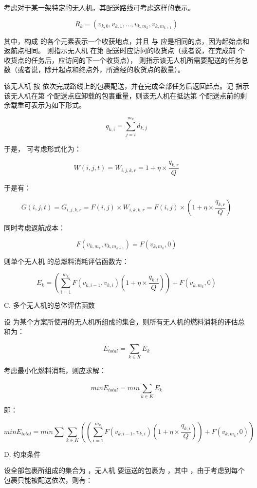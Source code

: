 \documentclass[UTF8,fontset=windows,12pt,a4paper]{ctexart}
\begin{document}
考虑对于某一架特定的无人机，其配送路线可考虑这样的表示。

\[{R}_{k}=\left({v}_{k,0},{v}_{k,1},…,{v}_{k,{m}_{k}},{v}_{k,{m}_{k+1}}\right)\]

其中，构成  的各个元素表示一个收获地点，并且  与  应是相同的点，因为起始点和返航点相同。 则指示无人机  在第  配送时应访问的收货点（或者说，在完成前  个收货点的任务后，应访问的下一个收货点）， 则指示该无人机所需要配送的任务总数（或者说，除开起点和终点外，所途经的收货点的数量）。

该无人机  按  依次完成路线上的包裹配送，并在完成全部任务后返回起点。记  指示该无人机在第  个配送点应卸载的包裹重量，则该无人机在抵达第  个配送点前的剩余载重可表示为如下形式。

\[{q}_{k,i}=\sum _{j=i}^{{m}_{k}} {d}_{k,j}\]

于是， 可考虑形式化为：

\[W\left(i,j,t\right)={W}_{i,j,k,r}=1+η\times \frac{{q}_{k,r}}{Q}\]

于是有：

\[G\left(i,j,t\right)={G}_{i,j,k,r}=F\left(i,j\right)\times {W}_{i,k,k,r}=F(i,j)\times \left(1+η\times \frac{{q}_{k,r}}{Q}\right)\]

同时考虑返航成本：

\[F\left({v}_{k,{m}_{k}},{v}_{k,{m}_{k+1}}\right)=F\left({v}_{k,{m}_{k}},0\right)\]

则单个无人机  的总燃料消耗评估函数为：

\[{E}_{k}=\left(\sum _{i=1}^{{m}_{k}} F\left({v}_{k,i-1},{v}_{k,i}\right)\left(1+η\times \frac{{q}_{k,i}}{Q}\right)\right)+F\left({v}_{k,{m}_{k}},0\right)\]

C. 多个无人机的总体评估函数

设  为某个方案所使用的无人机所组成的集合，则所有无人机的燃料消耗的评估总和为：

\[{E}_{total}=\sum _{k\in K}^{} {E}_{k}\]

考虑最小化燃料消耗，则应求解：

\[min{E}_{total}=min\sum _{k\in K}^{} {E}_{k}\]

即：

\[min{E}_{total}=min\sum \sum _{k\in K}^{} \left(\left(\sum _{i=1}^{{m}_{k}} F\left({v}_{k,i-1},{v}_{k,i}\right)\left(1+η\times \frac{{q}_{k,i}}{Q}\right)\right)+F\left({v}_{k,{m}_{k}},0\right)\right)\]

D. 约束条件

设全部包裹所组成的集合为 ，无人机  要运送的包裹为 ，其中 ，由于考虑到每个包裹只能被配送依次，则有：
\end{document}

